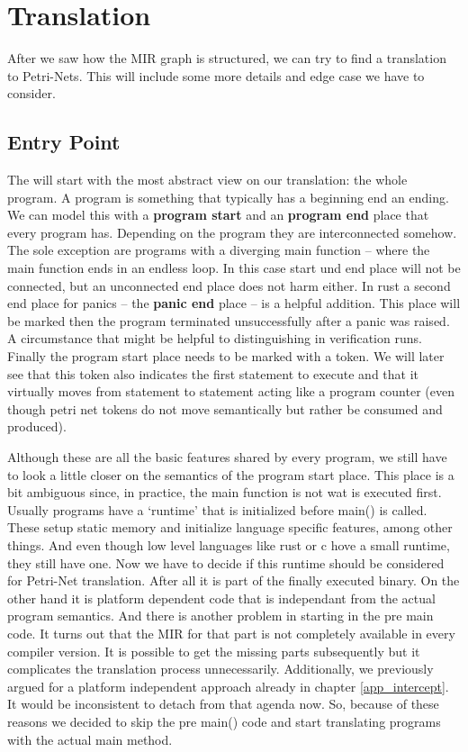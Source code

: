 \section{Translation}
\label{app_trans}
After we saw how the MIR graph is structured, we can try to find a translation to Petri-Nets. This will include some more details and edge case we have to consider.

\subsection{Entry Point}
The will start with the most abstract view on our translation: the whole program.
A program is something that typically has a beginning end an ending.
We can model this with a \textbf{program start} and an \textbf{program end} place that every program has.
Depending on the program they are interconnected somehow.
The sole exception are programs with a diverging main function -- where the main function ends in an endless loop.
In this case start und end place will not be connected, but an unconnected end place does not harm either.
In rust a second end place for panics -- the \textbf{panic end} place -- is a helpful addition.
This place will be marked then the program terminated unsuccessfully after a panic was raised.
A circumstance that might be helpful to distinguishing in verification runs.
Finally the program start place needs to be marked with a token.
We will later see that this token also indicates the first statement to execute and that it virtually moves from statement to statement acting like a program counter (even though petri net tokens do not move semantically but rather be consumed and produced).

Although these are all the basic features shared by every program, we still have to look a little closer on the semantics of the program start place.
This place is a bit ambiguous since, in practice, the main function is not wat is executed first.
Usually programs have a `runtime' that is initialized before main() is called.
These setup static memory and initialize language specific features, among other things.
And even though low level languages like rust or c hove a small runtime, they still have one.
Now we have to decide if this runtime should be considered for Petri-Net translation.
After all it is part of the finally executed binary.
On the other hand it is platform dependent code that is independant from the actual program semantics.
And there is another problem in starting in the pre main code.
It turns out that the MIR for that part is not completely available in every compiler version.
It is possible to get the missing parts subsequently but it complicates the translation process unnecessarily.
Additionally, we previously argued for a platform independent approach already in chapter \ref{app_intercept}.
It would be inconsistent to detach from that agenda now.
So, because of these reasons we decided to skip the pre main() code and start translating programs with the actual main method.

